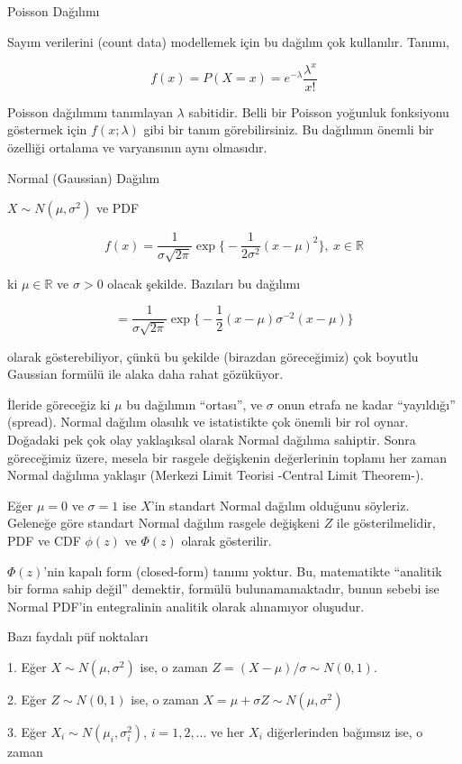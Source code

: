 \documentclass[12pt,fleqn]{article}\usepackage{../../common}
\begin{document}
Poisson Dağılımı

Sayım verilerini (count data) modellemek için bu dağılım çok
kullanılır. Tanımı, 

$$ f(x) = P(X=x) = e^{-\lambda}\frac{\lambda^{x}}{x!} $$

Poisson dağılımını tanımlayan $\lambda$ sabitidir. Belli bir Poisson
yoğunluk fonksiyonu göstermek için $f(x;\lambda)$ gibi bir tanım
görebilirsiniz. Bu dağılımın önemli bir özelliği ortalama ve varyansının
aynı olmasıdır. 

Normal (Gaussian) Dağılım

$X \sim N(\mu, \sigma^2)$ ve PDF

$$ f(x) = \frac{1}{\sigma\sqrt{2\pi}} 
\exp \bigg\{ - \frac{1}{2\sigma^2}(x-\mu)^2  \bigg\}
, \ x \in \mathbb{R}
$$

ki $\mu \in \mathbb{R}$ ve $\sigma > 0$ olacak şekilde. Bazıları bu
dağılımı 

$$  
= \frac{1}{\sigma\sqrt{2\pi}} 
\exp \bigg\{ -\frac{1}{2}(x-\mu)\sigma^{-2}(x-\mu)  \bigg\}
$$

olarak gösterebiliyor, çünkü bu şekilde (birazdan göreceğimiz) çok boyutlu
Gaussian formülü ile alaka daha rahat gözüküyor. 

İleride göreceğiz ki $\mu$ bu dağılımın ``ortası'', ve $\sigma$ onun
etrafa ne kadar ``yayıldığı'' (spread). Normal dağılım olasılık ve
istatistikte çok önemli bir rol oynar. Doğadaki pek çok olay
yaklaşıksal olarak Normal dağılıma sahiptir. Sonra göreceğimiz üzere,
mesela bir rasgele değişkenin değerlerinin toplamı her zaman Normal
dağılıma yaklaşır (Merkezi Limit Teorisi -Central Limit Theorem-). 

Eğer $\mu = 0$ ve $\sigma = 1$ ise $X$'in standart Normal dağılım olduğunu
söyleriz. Geleneğe göre standart Normal dağılım rasgele değişkeni $Z$ ile
gösterilmelidir, PDF ve CDF $\phi(z)$ ve $\Phi(z)$ olarak gösterilir. 

$\Phi(z)$'nin kapalı form (closed-form) tanımı yoktur. Bu, matematikte
``analitik bir forma sahip değil'' demektir, formülü bulunamamaktadır,
bunun sebebi ise Normal PDF'in entegralinin analitik olarak alınamıyor
oluşudur. 

Bazı faydalı püf noktaları

1. Eğer $X \sim N(\mu, \sigma^2)$ ise, o zaman $Z = (X-\mu) / \sigma \sim N(0,1)$. 

2. Eğer $Z \sim N(0,1)$ ise, o zaman $X = \mu + \sigma Z \sim N(\mu,\sigma^2)$

3. Eğer $X_i \sim N(\mu_i, \sigma_i^2)$, $i=1,2,...$ ve her $X_i$
diğerlerinden bağımsız ise, o zaman 
\end{document}

